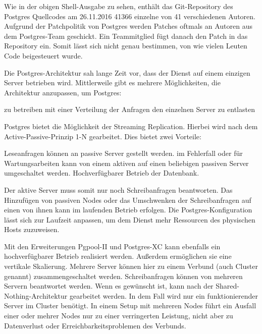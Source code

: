 Wie in der obigen Shell-Ausgabe zu sehen, enthält das \gls{Git}-\gls{Repository}
des Postgres Quellcodes am 26.11.2016 41366 einzelne 
von 41 verschiedenen Autoren. Aufgrund der Patchpolitik von Postgres werden
Patches oftmals an Autoren aus dem Postgres-Team geschickt. Ein Teammitglied
fügt danach den Patch in das Repository ein. Somit lässt sich nicht genau
bestimmen, von wie vielen Leuten Code beigesteuert wurde.

Die Postgres-Architektur sah lange Zeit vor, dass der Dienst auf einem einzigen
Server betrieben wird. Mittlerweile gibt es mehrere Möglichkeiten, die
Architektur anzupassen, um Postgres:

\begin{outline}
  \1  zu betreiben
  \1 
  \1 mit einer Verteilung der Anfragen den einzelnen Server zu entlasten
\end{outline}

Postgres bietet die Möglichkeit der \gls{Streaming Replication}. Hierbei wird
nach dem \gls{Active-Passive-Prinzip} 1-N gearbeitet. Dies bietet zwei
Vorteile:

\begin{outline}
  \1 Leseanfragen können an passive Server gestellt werden.
  \1 im Fehlerfall oder für Wartungsarbeiten kann von einem aktiven auf einen
  beliebigen passiven Server umgeschaltet werden.
  \1 Hochverfügbarer Betrieb der Datenbank.
\end{outline}

Der aktive Server muss somit nur noch Schreibanfragen beantworten. Das
Hinzufügen von passiven Nodes oder das Umschwenken der Schreibanfragen auf
einen von ihnen kann im laufenden Betrieb erfolgen. Die Postgres-Konfiguration
lässt sich zur Laufzeit anpassen, um dem Dienst mehr Ressourcen des physischen
Hosts zuzuweisen.

Mit den Erweiterungen \gls{Pgpool-II} und \gls{Postgres-XC} kann ebenfalls ein
hochverfügbarer Betrieb realisiert werden. Außerdem ermöglichen sie eine
vertikale \gls{Skalierung}. Mehrere Server können hier zu einem Verbund (auch
Cluster genannt) zusammengeschaltet werden. Schreibanfragen können von mehreren
Servern beantwortet werden. Wenn es gewünscht ist, kann nach der
\gls{Shared-Nothing-Architektur} gearbeitet werden. In dem Fall wird nur ein
funktionierender Server im Cluster benötigt. In einem Setup mit mehreren Nodes
führt ein Ausfall einer oder mehrer Nodes nur zu einer verringerten Leistung,
nicht aber zu Datenverlust oder Erreichbarkeitsproblemen des Verbunds.
\tm%

